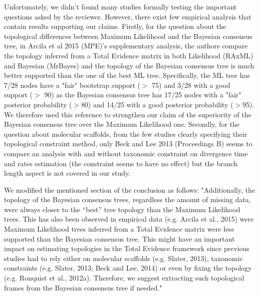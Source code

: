 \documentclass[12pt,letterpaper]{article}
\begin{document}
\begin{enumerate}
Unfortunately, we didn't found many studies formally testing the important questions asked by the reviewer. However, there exist few empirical analysis that contain results supporting our claims.
Firstly, for the question about the topological differences between Maximum Likelihood and the Bayesian consensus tree, in Arcila et al 2015 (MPE)'s supplementary analysis, the authors compare the topology inferred from a Total Evidence matrix in both Likelihood (RAxML) and Bayesian (MrBayes) and the topology of the Bayesian consensus tree is much better supported than the one of the best ML tree. Specifically, the ML tree has 7/28 nodes have a "fair" bootstrap support ($>$ 75) and 3/28 with a good support ($>$ 90) as the Bayesian consensus tree has 17/25 nodes with a "fair" posterior probability ($>$80) and 14/25 with a good posterior probability ($>$95). We therefore used this reference to strengthen our claim of the superiority of the Bayesian consensus tree over the Maximum Likelihood one.
Secondly, for the question about molecular scaffolds, from the few studies clearly specifying their topological constraint method, only Beck and Lee 2013 (Proceedings B) seems to compare an analysis with and without taxonomic constraint on divergence time and rates estimation (the constraint seems to have no effect) but the branch length aspect is not covered in our study.

We modified the mentioned section of the conclusion as follows:
"Additionally, the topology of the Bayesian consensus trees, regardless the amount of missing data, were always closer to the ``best'' tree topology than the Maximum Likelihood trees.
This has also been observed in empirical data (e.g. Arcila et al., 2015) were Maximum Likelihood trees inferred from a Total Evidence matrix were less supported than the Bayesian consensus tree.
This might have an important impact on estimating topologies in the Total Evidence framework since previous studies had to rely either on molecular scaffolds (e.g. Slater, 2013), taxonomic constraints (e.g. Slater, 2013; Beck and Lee, 2014) or even by fixing the topology (e.g. Ronquist et al., 2012a).
Therefore, we suggest extracting such topological frames from the Bayesian consensus tree if needed."


\end{enumerate}
\end{document}
